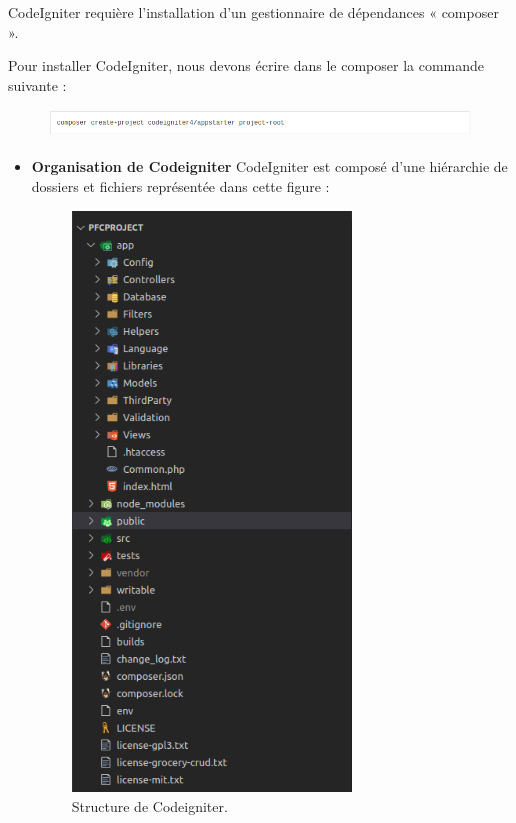 \documentclass[french]{report}
\begin{document}
        CodeIgniter requière l'installation d'un gestionnaire de dépendances « composer ».
        
        Pour installer CodeIgniter, nous devons écrire dans le composer la commande suivante :
        \begin{figure}[H]
            \centering
            \includegraphics[width=1\textwidth]{images/codeigniter.png}
            \label{CI initialisation}
           
        \end{figure}
        
        \begin{itemize}
            \item \textbf{Organisation de Codeigniter}
            CodeIgniter est composé d'une hiérarchie de dossiers et fichiers représentée dans cette figure :
            
            \begin{figure}[H]
                \centering
                \includegraphics[width=0.7\textwidth]{images/ci structure.png}
                \caption{Structure de Codeigniter.}
                \label{CI structure}
            \end{figure}
        

\end{itemize}
\end{document}
